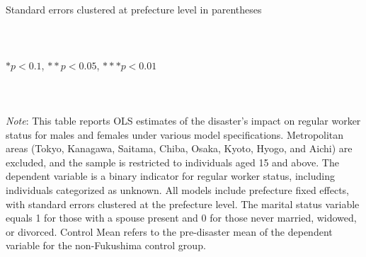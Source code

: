 \documentclass[serif, aspectratio=169]{beamer}
\begin{document}
\begin{frame}
\begin{table}[htbp]
\begin{tabular}{@{}l*{6}{c}@{}}
\bottomrule
\end{tabular}
\\\\{\linewidth}{\tiny Standard errors clustered at prefecture level in parentheses}\\\\
\\\\{\linewidth}{\tiny $*p<0.1$, $**p<0.05$, $***p<0.01$}\\\\
\\\\{\linewidth}{\tiny \textit{Note}: This table reports OLS estimates of the disaster's impact on regular worker status for males and females under various model specifications. Metropolitan areas (Tokyo, Kanagawa, Saitama, Chiba, Osaka, Kyoto, Hyogo, and Aichi) are excluded, and the sample is restricted to individuals aged 15 and above. The dependent variable is a binary indicator for regular worker status, including individuals categorized as unknown. All models include prefecture fixed effects, with standard errors clustered at the prefecture level. The marital status variable equals 1 for those with a spouse present and 0 for those never married, widowed, or divorced. Control Mean refers to the pre-disaster mean of the dependent variable for the non-Fukushima control group.}
\end{table}

\end{frame}

\end{document}
